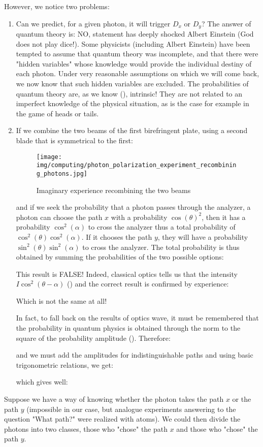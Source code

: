 	However, we notice two problems:
	\begin{enumerate}
		\item Can we predict, for a given photon, it will trigger $D_x$ or $D_y$? The answer of quantum theory is: NO, statement has deeply shocked Albert Einstein (God does not play dice!). Some physicists (including Albert Einstein) have been tempted to assume that quantum theory was incomplete, and that there were "hidden variables" whose knowledge would provide the individual destiny of each photon. Under very reasonable assumptions on which we will come back, we now know that such hidden variables are excluded. The probabilities of quantum theory are, as we know (), intrinsic! They are not related to an imperfect knowledge of the physical situation, as is the case for example in the game of heads or tails.

		\item If we combine the two beams of the first birefringent plate, using a second blade that is symmetrical to the first:
		\begin{figure}[H]
			\centering
			\texttt{[image: img/computing/photon\_polarization\_experiment\_recombining\_photons.jpg]}
			\caption[]{Imaginary experience recombining the two beams}
		\end{figure}
		and if we seek the probability that a photon passes through the analyzer, a photon can choose the path $x$ with a probability $\cos(\theta)^2$, then it has a probability $\cos^2(\alpha)$ to cross the analyzer thus a total probability of $\cos^2(\theta)\cos^2(\alpha)$. If it chooses the path $y$, they will have a probability $\sin^2(\theta)\sin^2(\alpha)$ to cross the analyzer. The total probability is thus obtained by summing the probabilities of the two possible options:
		
		This result is FALSE! Indeed, classical optics tells us that the intensity $I\cos^2(\theta-\alpha)$ () and the correct result is confirmed by experience:
		
		Which is not the same at all!
		
		In fact, to fall back on the results of optics wave, it must be remembered that the probability in quantum physics is obtained through the norm to the square of the probability amplitude (). Therefore:
		
		and we must add the amplitudes for indistinguishable paths and using basic trigonometric relations, we get:
		
		which gives well:
		
	\end{enumerate}
	Suppose we have a way of knowing whether the photon takes the path $x$ or the path $y$ (impossible in our case, but analogue experiments answering to the question "What path?" were realized with atoms). We could then divide the photons into two classes, those who "chose" the path $x$ and those who "chose" the path $y$.
	
